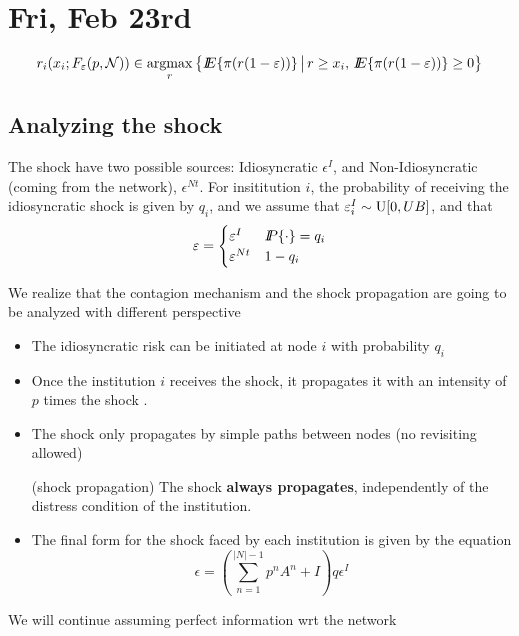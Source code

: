 \section{Fri, Feb 23rd}
\[r_i(x_i;F_\epsilon(p,\cN))\in\argmax_r\lset \Ex\{ \pi(r(1-\epsilon))\}\mset r\geq x_i,\,\Ex\{ \pi(r(1-\epsilon))\}\geq 0\rset\]
\subsection{Analyzing the shock}
The shock have two possible sources: Idiosyncratic $\epsilon^I$, and Non-Idiosyncratic (coming from the network), $\epsilon^{Nt}$.  For insititution $i$, the probability of receiving the idiosyncratic shock is given by $q_i$, and we assume that $\epsilon_i^I\sim {\rm U}[0,UB]$, and that 
\[\epsilon=\begin{cases}
\epsilon^I&\Pro\{\cdot\}=q_i\\
\epsilon^{Nt}&1-q_i
\end{cases}\]

We realize that the contagion mechanism and the shock propagation are going to be analyzed with different perspective
\begin{itemize}
\item The idiosyncratic risk can be initiated at node $i$ with probability $q_i$
\item Once the institution $i$ receives the shock, it propagates it with an intensity of $p$ times the shock . 
\item The shock only propagates by simple paths between nodes (no revisiting allowed)

\begin{assumption}{\rm (shock propagation)}\label{assshprop}
The shock {\bf always propagates}, independently of the distress condition of the institution.
\end{assumption}
\item The final form for the shock faced by each institution is given by the equation
\begin{equation}\label{eqshockprop}
\epsilon = \left(\sum_{n=1}^{|N|-1} p^nA^n+I\right)q\epsilon^I
\end{equation}
\end{itemize}

 We will continue assuming perfect information wrt the network

